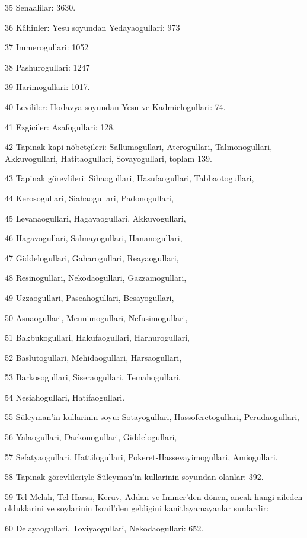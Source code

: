 \par 35 Senaalilar: 3630.
\par 36 Kâhinler: Yesu soyundan Yedayaogullari: 973
\par 37 Immerogullari: 1052
\par 38 Pashurogullari: 1247
\par 39 Harimogullari: 1017.
\par 40 Levililer: Hodavya soyundan Yesu ve Kadmielogullari: 74.
\par 41 Ezgiciler: Asafogullari: 128.
\par 42 Tapinak kapi nöbetçileri: Sallumogullari, Aterogullari, Talmonogullari, Akkuvogullari, Hatitaogullari, Sovayogullari, toplam 139.
\par 43 Tapinak görevlileri: Sihaogullari, Hasufaogullari, Tabbaotogullari,
\par 44 Kerosogullari, Siahaogullari, Padonogullari,
\par 45 Levanaogullari, Hagavaogullari, Akkuvogullari,
\par 46 Hagavogullari, Salmayogullari, Hananogullari,
\par 47 Giddelogullari, Gaharogullari, Reayaogullari,
\par 48 Resinogullari, Nekodaogullari, Gazzamogullari,
\par 49 Uzzaogullari, Paseahogullari, Besayogullari,
\par 50 Asnaogullari, Meunimogullari, Nefusimogullari,
\par 51 Bakbukogullari, Hakufaogullari, Harhurogullari,
\par 52 Baslutogullari, Mehidaogullari, Harsaogullari,
\par 53 Barkosogullari, Siseraogullari, Temahogullari,
\par 54 Nesiahogullari, Hatifaogullari.
\par 55 Süleyman'in kullarinin soyu: Sotayogullari, Hassoferetogullari, Perudaogullari,
\par 56 Yalaogullari, Darkonogullari, Giddelogullari,
\par 57 Sefatyaogullari, Hattilogullari, Pokeret-Hassevayimogullari, Amiogullari.
\par 58 Tapinak görevlileriyle Süleyman'in kullarinin soyundan olanlar: 392.
\par 59 Tel-Melah, Tel-Harsa, Keruv, Addan ve Immer'den dönen, ancak hangi aileden olduklarini ve soylarinin Israil'den geldigini kanitlayamayanlar sunlardir:
\par 60 Delayaogullari, Toviyaogullari, Nekodaogullari: 652.
